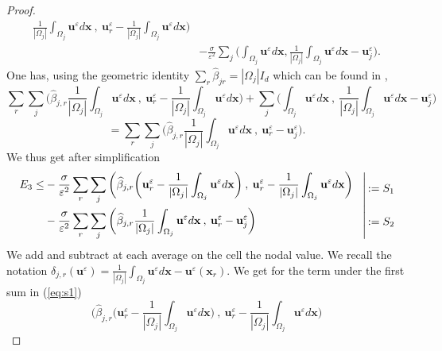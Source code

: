 \documentclass[a4paper,french,english,10pt]{article}
\newcommand\uu{\mathbf{u}}
\newcommand\be{\widehat{\beta}_{jr}}
\newcommand\eps{\varepsilon}
\newcommand\x{\mathbf{x}}
\begin{document}
\begin{proof}
\begin{equation*}
\begin{aligned}
\frac{1}{|\Omega_j|}\int_{\Omega_j} \textbf{u}^{\eps} d\x  \: , \:
\textbf{u}_r^{\eps}-\frac{1}{|\Omega_j|}\int_{\Omega_j} \textbf{u}^{\eps} d\x
\bigg)\\
&-\frac{\sigma}{\eps^2}\sum_j\bigg( \int_{\Omega_j}\textbf{u}^{\eps}d\x , 
\frac{1}{|\Omega_j|}  \int_{\Omega_j}\textbf{u}^{\eps}d\x -\textbf{u}^{\eps}_j
\bigg).
\end{aligned}
\end{equation*}
One has, using the geometric identity 
$\sum_r \be =|\Omega_j| I_d$ which can be found in \cite{glaceap,de10},
$$
  \sum_r \sum_j  \bigg( \widehat{\beta}_{j,r}
\frac{1}{|\Omega_j|}\int_{\Omega_j} \textbf{u}^{\eps} d\x  \: , \:
\textbf{u}_r^{\eps}-\frac{1}{|\Omega_j|}\int_{\Omega_j} \textbf{u}^{\eps} d\x
\bigg) +
\sum_j  \bigg( \int_{\Omega_j} \textbf{u}^{\eps} d\x  \: , \:
\frac{1}{|\Omega_j|}\int_{\Omega_j} \textbf{u}^{\eps} d\x-\textbf{u}_j^{\eps}
\bigg)
$$
$$
= \sum_r \sum_j  \bigg( \widehat{\beta}_{j,r}
\frac{1}{|\Omega_j|}\int_{\Omega_j} \textbf{u}^{\eps} d\x  \: , \:
\textbf{u}_r^{\eps}-\textbf{u}_j^{\eps} \bigg) 
.
 $$
We thus get after simplification 
\begin{equation}\label{eq:s1}
\left.
\begin{aligned}
E_3\leq &-\frac{\sigma}{\eps^2} \sum_r \sum_j  \bigg( \widehat{\beta}_{j,r}\bigg(
\textbf{u}_r^{\eps}- \frac{1}{|\Omega_j|}\int_{\Omega_j} 
\textbf{u}^{\eps} d\x\bigg ) 
\: , \: \textbf{u}_r^{\eps}-\frac{1}{|\Omega_j|}\int_{\Omega_j}
\textbf{u}^{\eps} d\x \bigg)
 \\
&-\frac{\sigma}{\eps^2} \sum_r \sum_j  \bigg( \widehat{\beta}_{j,r}
\frac{1}{|\Omega_j|}\int_{\Omega_j} \textbf{u}^{\eps} d\x  \: , \:
\textbf{u}_r^{\eps}-\textbf{u}_j^{\eps} \bigg)
\end{aligned}
\hspace{0.3cm}
\right|
\begin{aligned}
:=S_1 \\
\\
:=S_2
\end{aligned}
\end{equation}
We add and subtract at each average on the cell the nodal value. 
We recall the notation  
$\delta_{j,r}(\textbf{u}^{\eps})=\frac{1}{|\Omega_j|}\int_{\Omega_j}
\uu^{\eps} d\x-\textbf{u}^{\eps}(\textbf{x}_r)$.
We get for the term under the first sum in (\ref{eq:s1})
$$
\bigg( \widehat{\beta}_{j,r}\bigg(
\textbf{u}_r^{\eps}- \frac{1}{|\Omega_j|}\int_{\Omega_j} 
\textbf{u}^{\eps} d\x\bigg ) 
\: , \: \textbf{u}_r^{\eps}-\frac{1}{|\Omega_j|}\int_{\Omega_j}
\textbf{u}^{\eps} d\x \bigg)
$$
\end{proof}
\end{document}

